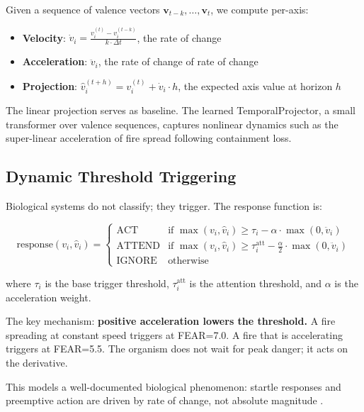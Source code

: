 \documentclass[11pt]{article}
\begin{document}
Given a sequence of valence vectors $\mathbf{v}_{t-k}, \ldots, \mathbf{v}_t$, we compute per-axis:

\begin{itemize}
    \item \textbf{Velocity}: $\dot{v}_i = \frac{v_i^{(t)} - v_i^{(t-k)}}{k \cdot \Delta t}$, the rate of change
    \item \textbf{Acceleration}: $\ddot{v}_i$, the rate of change of rate of change
    \item \textbf{Projection}: $\hat{v}_i^{(t+h)} = v_i^{(t)} + \dot{v}_i \cdot h$, the expected axis value at horizon $h$
\end{itemize}

The linear projection serves as baseline. The learned TemporalProjector, a small transformer over valence sequences, captures nonlinear dynamics such as the super-linear acceleration of fire spread following containment loss.

\subsection{Dynamic Threshold Triggering}

Biological systems do not classify; they trigger. The response function is:

\begin{equation}
\text{response}(v_i, \hat{v}_i) = \begin{cases} \text{ACT} & \text{if } \max(v_i, \hat{v}_i) \geq \tau_i - \alpha \cdot \max(0, \ddot{v}_i) \\ \text{ATTEND} & \text{if } \max(v_i, \hat{v}_i) \geq \tau_i^{\text{att}} - \frac{\alpha}{2} \cdot \max(0, \ddot{v}_i) \\ \text{IGNORE} & \text{otherwise} \end{cases}
\end{equation}

\noindent where $\tau_i$ is the base trigger threshold, $\tau_i^{\text{att}}$ is the attention threshold, and $\alpha$ is the acceleration weight.

The key mechanism: \textbf{positive acceleration lowers the threshold.} A fire spreading at constant speed triggers at FEAR=7.0. A fire that is accelerating triggers at FEAR=5.5. The organism does not wait for peak danger; it acts on the derivative.

This models a well-documented biological phenomenon: startle responses and preemptive action are driven by rate of change, not absolute magnitude \citep{schiff1965,regan1995}.
\end{document}
